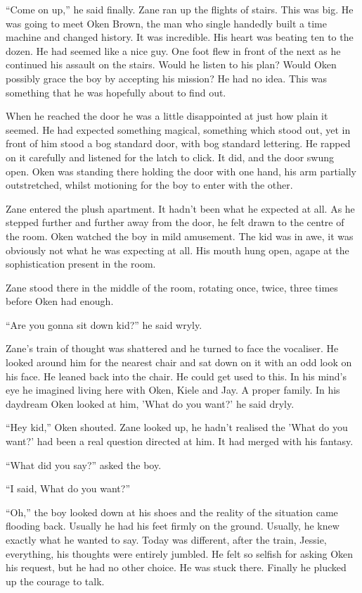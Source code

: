 ``Come on up,'' he said finally.  Zane ran up the flights of stairs.  This was big.  He was going to meet Oken Brown, the man who single handedly built a time machine and changed history.  It was incredible.  His heart was beating ten to the dozen.  He had seemed like a nice guy.  One foot flew in front of the next as he continued his assault on the stairs.  Would he listen to his plan?  Would Oken possibly grace the boy by accepting his mission?  He had no idea.  This was something that he was hopefully about to find out.

When he reached the door he was a little disappointed at just how plain it seemed.  He had expected something magical, something which stood out, yet in front of him stood a bog standard door, with bog standard lettering.  He rapped on it carefully and listened for the latch to click.  It did, and the door swung open.  Oken was standing there holding the door with one hand, his arm partially outstretched, whilst motioning for the boy to enter with the other.  

Zane entered the plush apartment.  It hadn't been what he expected at all.  As he stepped further and further away from the door, he felt drawn to the centre of the room.  Oken watched the boy in mild amusement.  The kid was in awe, it was obviously not what he was expecting at all.  His mouth hung open, agape at the sophistication present in the room.  

Zane stood there in the middle of the room, rotating once, twice, three times before Oken had enough.

``Are you gonna sit down kid?'' he said wryly.  

Zane's train of thought was shattered and he turned to face the vocaliser.  He looked around him for the nearest chair and sat down on it with an odd look on his face.  He leaned back into the chair.  He could get used to this.  In his mind's eye he imagined living here with Oken, Kiele and Jay.  A proper family.  In his daydream Oken looked at him, 'What do you want?' he said dryly.  

``Hey kid,'' Oken shouted.  Zane looked up, he hadn't realised the 'What do you want?' had been a real question directed at him.  It had merged with his fantasy.  

``What did you say?'' asked the boy.

``I said, What do you want?''

``Oh,'' the boy looked down at his shoes and the reality of the situation came flooding back.  Usually he had his feet firmly on the ground.  Usually, he knew exactly what he wanted to say.  Today was different, after the train, Jessie, everything, his thoughts were entirely jumbled.  He felt so selfish for asking Oken his request, but he had no other choice.  He was stuck there.  Finally he plucked up the courage to talk.

